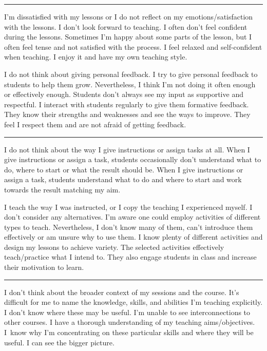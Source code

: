 \rule{\textwidth}{0.4pt}
{I'm dissatisfied with my lessons or I do not reflect on my emotions/satisfaction with the lessons. I don't look forward to teaching.}
{I often don't feel confident during the lessons. Sometimes I'm happy about some parts of the lesson, but I often feel tense and not satisfied with the process.}
{I feel relaxed and self-confident when teaching. I enjoy it and have my own teaching style.}

\newpage
{}
{I do not think about giving personal feedback.}
{I try to give personal feedback to students to help them grow. Nevertheless, I think I'm not doing it often enough or effectively enough. Students don't always see my input as supportive and respectful.}
{I interact with students regularly to give them formative feedback. They know their strengths and weaknesses and see the ways to improve. They feel I respect them and are not afraid of getting feedback.}

\rule{\textwidth}{0.4pt}
{I do not think about the way I give instructions or assign tasks at all.}
{When I give instructions or assign a task, students occasionally don't understand what to do, where to start or what the result should be.}
{When I give instructions or assign a task, students understand what to do and where to start and work towards the result matching my aim.}

\newpage
{}
{I teach the way I was instructed, or I copy the teaching I experienced myself. I don't consider any alternatives.}
{I'm aware one could employ activities of different types to teach. Nevertheless, I don't know many of them, can't introduce them effectively or am unsure why to use them.}
{I know plenty of different activities and design my lessons to achieve variety. The selected activities effectively teach/practice what I intend to. They also engage students in class and increase their motivation to learn.}

\rule{\textwidth}{0.4pt}
{I don't think about the broader context of my sessions and the course.}
{It's difficult for me to name the knowledge, skills, and abilities I'm teaching explicitly. I don't know where these may be useful. I'm unable to see interconnections to other courses.}
{I have a thorough understanding of my teaching aims/objectives. I~know why I'm concentrating on these particular skills and where they will be useful. I can see the bigger picture.}
\vspace*{-1em}

